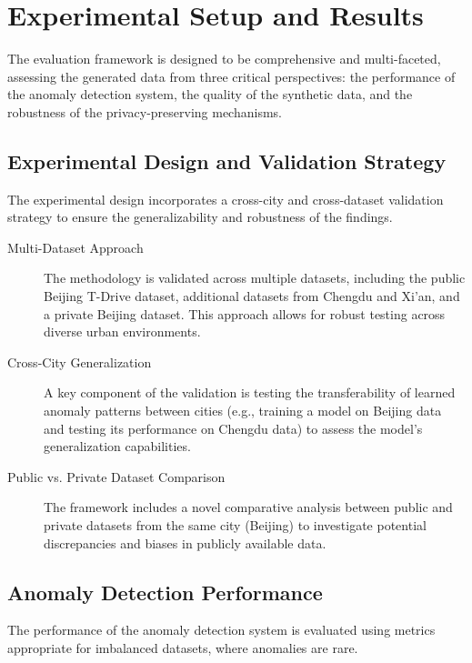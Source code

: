 \documentclass[runningheads]{llncs}
\begin{document}
\section{Experimental Setup and Results}
\label{sec:evaluation}

The evaluation framework is designed to be comprehensive and multi-faceted, assessing the generated data from three critical perspectives: the performance of the anomaly detection system, the quality of the synthetic data, and the robustness of the privacy-preserving mechanisms.

\subsection{Experimental Design and Validation Strategy}
\label{sec:exp-design}

The experimental design incorporates a cross-city and cross-dataset validation strategy to ensure the generalizability and robustness of the findings.

\begin{description}
    \item[Multi-Dataset Approach] The methodology is validated across multiple datasets, including the public Beijing T-Drive dataset, additional datasets from Chengdu and Xi'an, and a private Beijing dataset. This approach allows for robust testing across diverse urban environments.
    \item[Cross-City Generalization] A key component of the validation is testing the transferability of learned anomaly patterns between cities (e.g., training a model on Beijing data and testing its performance on Chengdu data) to assess the model's generalization capabilities.
    \item[Public vs. Private Dataset Comparison] The framework includes a novel comparative analysis between public and private datasets from the same city (Beijing) to investigate potential discrepancies and biases in publicly available data.
\end{description}

\subsection{Anomaly Detection Performance}
\label{sec:results}

The performance of the anomaly detection system is evaluated using metrics appropriate for imbalanced datasets, where anomalies are rare.
\end{document}
